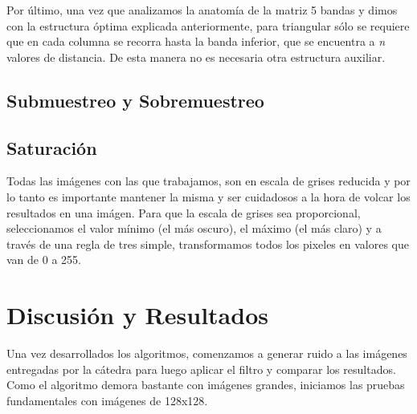 \documentclass[a4paper]{article}
\begin{document}
Por último, una vez que analizamos la anatomía de la matriz 5 bandas y dimos con la estructura óptima explicada anteriormente, para triangular sólo se requiere que en cada columna se recorra hasta la banda inferior, que se encuentra a \textit{n} valores de distancia. De esta manera no es necesaria otra estructura auxiliar.  

\subsection{Submuestreo y Sobremuestreo}

\subsection{Saturación}

Todas las imágenes con las que trabajamos, son en escala de grises reducida y por lo tanto es importante mantener la misma y ser cuidadosos a la hora de volcar los resultados en una imágen. Para que la escala de grises sea proporcional, seleccionamos el valor mínimo (el más oscuro), el máximo (el más claro) y a través de una regla de tres simple, transformamos todos los pixeles en valores que van de 0 a 255.


\section{Discusión y Resultados}


Una vez desarrollados los algoritmos, comenzamos a generar ruido a las imágenes entregadas por la cátedra para luego aplicar el filtro y comparar los resultados. Como el algoritmo demora bastante con imágenes grandes, iniciamos las pruebas fundamentales con imágenes de 128x128.
\end{document}
